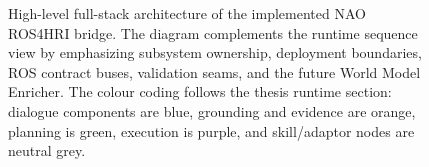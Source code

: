 \documentclass[12pt,a4paper]{article}
\newif\ifexportdiagrams
\begin{document}
\begin{landscape}
\begin{figure}[p]
{%
}
\ifexportdiagrams\else
  \caption{High-level full-stack architecture of the implemented NAO ROS4HRI bridge. The diagram complements the runtime sequence view by emphasizing subsystem ownership, deployment boundaries, ROS contract buses, validation seams, and the future World Model Enricher. The colour coding follows the thesis runtime section: dialogue components are blue, grounding and evidence are orange, planning is green, execution is purple, and skill/adaptor nodes are neutral grey.}
  \label{fig:full-stack-architecture-plate}
\fi
\end{figure}
\end{landscape}
\end{document}
